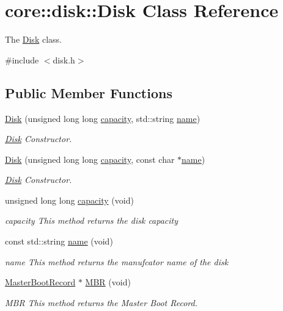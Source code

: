 \hypertarget{classcore_1_1disk_1_1_disk}{}\section{core\+:\+:disk\+:\+:Disk Class Reference}
\label{classcore_1_1disk_1_1_disk}


The \mbox{\hyperlink{classcore_1_1disk_1_1_disk}{Disk}} class.  




{\ttfamily \#include $<$disk.\+h$>$}

\subsection*{Public Member Functions}
\begin{DoxyCompactItemize}
\item 
\mbox{\hyperlink{classcore_1_1disk_1_1_disk_a1531676df8b095dc6e818458aebf9dee}{Disk}} (unsigned long long \mbox{\hyperlink{classcore_1_1disk_1_1_disk_a4f0d7b0ab94fb0ed0a58bb19ce85729f}{capacity}}, std\+::string \mbox{\hyperlink{classcore_1_1disk_1_1_disk_a889c305501805431f1189f179d8281ca}{name}})
\begin{DoxyCompactList}\small\item\em \mbox{\hyperlink{classcore_1_1disk_1_1_disk}{Disk}} Constructor. \end{DoxyCompactList}\item 
\mbox{\hyperlink{classcore_1_1disk_1_1_disk_ad7164897c3af79602e86463065550754}{Disk}} (unsigned long long \mbox{\hyperlink{classcore_1_1disk_1_1_disk_a4f0d7b0ab94fb0ed0a58bb19ce85729f}{capacity}}, const char $\ast$\mbox{\hyperlink{classcore_1_1disk_1_1_disk_a889c305501805431f1189f179d8281ca}{name}})
\begin{DoxyCompactList}\small\item\em \mbox{\hyperlink{classcore_1_1disk_1_1_disk}{Disk}} Constructor. \end{DoxyCompactList}\item 
unsigned long long \mbox{\hyperlink{classcore_1_1disk_1_1_disk_a4f0d7b0ab94fb0ed0a58bb19ce85729f}{capacity}} (void)
\begin{DoxyCompactList}\small\item\em capacity This method returns the disk capacity \end{DoxyCompactList}\item 
const std\+::string \mbox{\hyperlink{classcore_1_1disk_1_1_disk_a889c305501805431f1189f179d8281ca}{name}} (void)
\begin{DoxyCompactList}\small\item\em name This method returns the manufcator name of the disk \end{DoxyCompactList}\item 
\mbox{\hyperlink{classcore_1_1disk_1_1_master_boot_record}{Master\+Boot\+Record}} $\ast$ \mbox{\hyperlink{classcore_1_1disk_1_1_disk_ac3ed02b2b44d2d15039d3616238c0985}{M\+BR}} (void)
\begin{DoxyCompactList}\small\item\em M\+BR This method returns the Master Boot Record. \end{DoxyCompactList}\end{DoxyCompactItemize}
